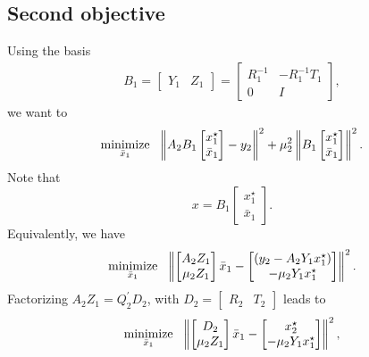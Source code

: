 \documentclass[12pt]{article}
\begin{document}
\newpage

\subsection{Second objective}

Using the basis
%
\begin{align*}
B_1 = \begin{bmatrix} Y_1 & Z_1 \end{bmatrix} =
\begin{bmatrix} R_1^{-1} & -R_1^{-1}T_1 \\ 0 & I \end{bmatrix},
\end{align*}
%
we want to
%
\begin{align*}
  \mathop{\mbox{minimize}}_{\bar{x}_1} \ \  \left\lVert A_2B_1\begin{bmatrix} x_1^{\star} \\ \bar{x}_1 \end{bmatrix} - y_2\right\rVert^2 +
  \mu_2^2\left\lVert B_1\begin{bmatrix} x_1^{\star} \\ \bar{x}_1 \end{bmatrix}\right\rVert^2.
\end{align*}
%
Note that
%
\[
x = B_1\begin{bmatrix} x_1^{\star} \\ \bar{x}_1 \end{bmatrix}.
\]
%
Equivalently, we have
%
\begin{align*}
  \mathop{\mbox{minimize}}_{\bar{x}_1} \ \  \left\lVert\begin{bmatrix}A_2Z_1 \\ \mu_2Z_1\end{bmatrix}\bar{x}_1 -
      \begin{bmatrix} (y_2 - A_2Y_1x_1^{\star}) \\ -\mu_2Y_1x_1^{\star}\end{bmatrix} \right\rVert^2.
\end{align*}
%
Factorizing $A_2Z_1 = Q_2^{'}D_2$, with $D_2 = \begin{bmatrix} R_2 & T_2\end{bmatrix}$ leads to
%
\begin{align} \label{eq.LS2}
  \mathop{\mbox{minimize}}_{\bar{x}_1} \ \  \left\lVert\begin{bmatrix} D_2 \\ \mu_2Z_1 \end{bmatrix}\bar{x}_1 -
    \begin{bmatrix} x_2^{\star} \\ -\mu_2Y_1x_1^{\star} \end{bmatrix}\right\rVert^2,
\end{align}
\end{document}
